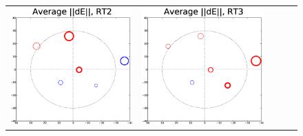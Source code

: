\documentclass[]{aa}
\begin{document}
\begin{figure}
\begin{tabular}{@{}c@{}c@{}c@{}c@{}c@{}}
\includegraphics[width=\roguewidth]{o2006_dE_ant2} &
\includegraphics[width=\roguewidth]{o2006_dE_ant3} &

\end{tabular}
\end{figure}
\end{document}

